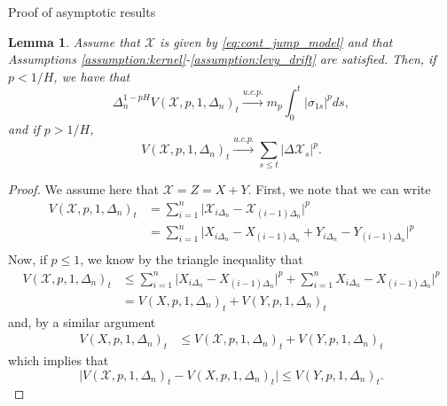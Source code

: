 \documentclass[fleqn,11pt,letterpaper]{article}
\theoremstyle{plain}
\newtheorem{lemma}{Lemma}[section]
\theoremstyle{definition}
\theoremstyle{remark}
\numberwithin{equation}{section}
\begin{document}
\begin{section}{Proof of asymptotic results}
\begin{lemma}\label{lemma:contjump_pvar_conv}
    Assume that $\mathcal{X}$ is given by \eqref{eq:cont_jump_model} and that Assumptions \ref{assumption:kernel}-\ref{assumption:levy_drift} are satisfied. Then, if $p<1/H$, we have that 
    \begin{equation}
        \Delta_n^{1-pH}V(\mathcal{X},p,1,\Delta_n)_t\overset{u.c.p.}{\to}m_p\int_0^t\vert \sigma_{1s}\vert^pds,
    \end{equation}
    and if $p>1/H$,
    \begin{equation}
        V(\mathcal{X},p,1,\Delta_n)_t\overset{u.c.p.}{\to}\sum_{s \leq t}\left|\Delta \mathcal{X}_s\right|^p.
    \end{equation}
\end{lemma}
\begin{proof}
    We assume here that $\mathcal{X}=Z=X+Y$. First, we note that we can write 
    \begin{equation}
        \begin{split}
            V(\mathcal{X},p,1,\Delta_n)_t&=\sum_{i=1}^n\vert \mathcal{X}_{i\Delta_n}-\mathcal{X}_{(i-1)\Delta_n}\vert^p\\
            &=\sum_{i=1}^n\vert X_{i\Delta_n}-X_{(i-1)\Delta_n} + Y_{i\Delta_n}-Y_{(i-1)\Delta_n}\vert^p\\
        \end{split}
    \end{equation}
    Now, if $p\leq1$, we know by the triangle inequality that 
    \begin{equation}
        \begin{split}
            V(\mathcal{X},p,1,\Delta_n)_t&\leq\sum_{i=1}^n\vert X_{i\Delta_n}-X_{(i-1)\Delta_n}\vert^p + \sum_{i=1}^nX_{i\Delta_n}-X_{(i-1)\Delta_n}\vert^p\\
            &= V(X,p,1,\Delta_n)_t + V(Y,p,1,\Delta_n)_t
        \end{split}
    \end{equation}
    and, by a similar argument 
    \begin{equation}
        \begin{split}
            V(X,p,1,\Delta_n)_t&\leq V(\mathcal{X},p,1,\Delta_n)_t + V(Y,p,1,\Delta_n)_t
        \end{split}
    \end{equation}
    which implies that 
    \begin{equation}
        \vert V(\mathcal{X},p,1,\Delta_n)_t - V(X,p,1,\Delta_n)_t\vert\leq V(Y,p,1,\Delta_n)_t.
    \end{equation}

\end{proof}
\end{section}
\end{document}
